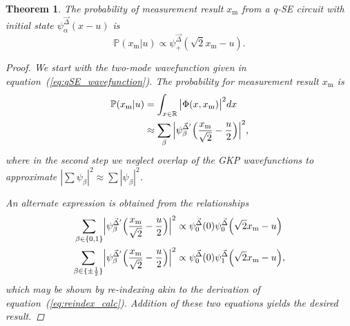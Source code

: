 \documentclass[prx,reprint,superscriptaddress,longbibliography,floatfix,nofootinbib]{revtex4-1}
\newtheorem{theorem}{Theorem}
\begin{document}
\begin{theorem}
\label{result_proof_of_P_x_m_given_u} The probability of measurement result $x_\mathrm{m}$ from a q-SE circuit with initial state $\psi^{\vec{\Delta}}_{\alpha}(x - u)$ is 
\begin{equation*}
\mathbb{P}(x_\mathrm{m}|u) \propto \psi^{\vec{\Delta}}_{+}(\sqrt{2}x_\mathrm{m} - u).   
\end{equation*}

\begin{proof}
We start with the two-mode wavefunction given in equation~(\ref{eq:qSE_wavefunction}). The probability for measurement result $x_\mathrm{m}$ is 
\begin{equation}
\begin{split}
 \mathbb{P}(x_\text{m}|u) & = \int_{x\in \mathbb{R}} \big|\Phi(x,x_\mathrm{m})\big|^2 dx \\
 & \approx \sum_{\beta} \Big{|}\psi_{\beta}^{\vec{\Delta}'} \Big{(}\frac{x_\text{m}}{\sqrt{2}}-\frac{u}{2}\Big{)}\Big{|}^2, 
\end{split}
\end{equation} 
where in the second step we neglect overlap of the GKP wavefunctions to approximate $|\sum \psi_{\beta}|^2 \approx \sum |\psi_{\beta}|^2$.  

An alternate expression is obtained from the relationships
\begin{equation}
\label{eq:reindexed}
\begin{aligned}
\sum_{\beta \in \{0,1 \} }&\Big{|}\psi_{\beta}^{\vec{\Delta}'} \Big{(}\frac{x_\text{m}}{\sqrt{2}}-\frac{u}{2}\Big{)}\Big{|}^2 \propto  \psi_{0}^{\vec{\Delta}} (0)  \psi_{0}^{\vec{\Delta}} \Big{(}\sqrt{2}x_\text{m}-u\Big{)} \\
\sum_{\beta \in \{\pm \frac{1}{2}\} }&\Big{|}\psi_{\beta}^{\vec{\Delta}'} \Big{(}\frac{x_\text{m}}{\sqrt{2}}-\frac{u}{2}\Big{)}\Big{|}^2 \propto  \psi_{0}^{\vec{\Delta}} (0)  \psi_{1}^{\vec{\Delta}} \Big{(}\sqrt{2}x_\text{m}-u\Big{)}, \\
\end{aligned}
\end{equation} 
which may be shown by re-indexing akin to the derivation of equation~(\ref{eq:reindex_calc}). Addition of these two equations yields the desired result. 
\end{proof}
\end{theorem}
\end{document}
